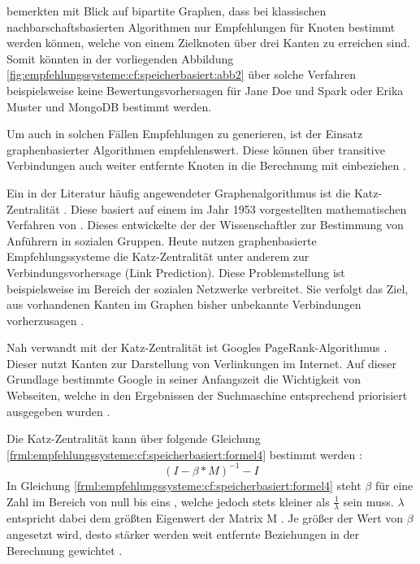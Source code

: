 \textcite[S. 7ff.]{huang:2004} bemerkten mit Blick auf bipartite Graphen, dass bei klassischen nachbarschaftsbasierten Algorithmen nur Empfehlungen für Knoten bestimmt werden können, welche von einem Zielknoten über drei Kanten zu erreichen sind. Somit könnten in der vorliegenden Abbildung \ref{fig:empfehlungssysteme:cf:speicherbasiert:abb2} über solche Verfahren beispielsweise keine Bewertungsvorhersagen für Jane Doe und Spark oder Erika Muster und MongoDB bestimmt werden.

Um auch in solchen Fällen Empfehlungen zu generieren, ist der Einsatz graphenbasierter Algorithmen empfehlenswert. Diese können über transitive Verbindungen auch weiter entfernte Knoten in die Berechnung mit einbeziehen \cite[S. 60f.]{recommenderSystems:2016}.

Ein in der Literatur häufig angewendeter Graphenalgorithmus ist die Katz-Zentralität \cite[S. 1ff.]{zhan:2017}\cite[S. 6]{guns:2014}\cite[S. 1f.]{huang:2004}. Diese basiert auf einem im Jahr 1953 vorgestellten mathematischen Verfahren von \textcite[S. 1ff.]{katz:1953}. Dieses entwickelte der der Wissenschaftler zur Bestimmung von Anführern in sozialen Gruppen. Heute nutzen graphenbasierte Empfehlungssysteme die Katz-Zentralität unter anderem zur Verbindungsvorhersage (Link Prediction). Diese Problemstellung ist beispielsweise im Bereich der sozialen Netzwerke verbreitet. Sie verfolgt das Ziel, aus vorhandenen Kanten im Graphen bisher unbekannte Verbindungen vorherzusagen \cite[S. 1ff.]{libenNowell:2007}.

Nah verwandt mit der Katz-Zentralität ist Googles PageRank-Algorithmus \cite[S. 1]{was:2018}. Dieser nutzt Kanten zur Darstellung von Verlinkungen im Internet. Auf dieser Grundlage bestimmte Google in seiner Anfangszeit die Wichtigkeit von Webseiten, welche in den Ergebnissen der Suchmaschine entsprechend priorisiert ausgegeben wurden \cite[S. 3ff.]{page:1999}.

Die Katz-Zentralität kann über folgende Gleichung \ref{frml:empfehlungssysteme:cf:speicherbasiert:formel4} bestimmt werden \cite[S. 4]{libenNowell:2007}:
\begin{equation}
	(I - \beta * M)^{-1} - I
	\label{frml:empfehlungssysteme:cf:speicherbasiert:formel4}
\end{equation}
In Gleichung \ref{frml:empfehlungssysteme:cf:speicherbasiert:formel4} steht $\beta$ für eine Zahl im Bereich von null bis eins \cite[S. 6]{guns:2014}, welche jedoch stets kleiner als $\frac{1}{\lambda}$ sein muss. $\lambda$ entspricht dabei dem größten Eigenwert der Matrix M \cite[S. 6]{zhan:2017}. Je größer der Wert von $\beta$ angesetzt wird, desto stärker werden weit entfernte Beziehungen in der Berechnung gewichtet \cite[S. 6]{guns:2014}.

